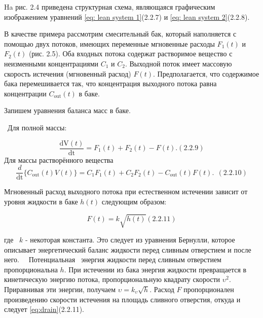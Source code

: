 		Ha рис. 2.4 приведена структурная схема, являющаяся графичес­ким изображением уравнений \eqref{eq: lean system 1}(2.2.7) и \eqref{eq: lean system 2}(2.2.8).



		В качестве примера рассмотрим смесительный бак, который напол­няется с помощью двух потоков, имеющих переменные
		мгновенные расходы  $F_1(t)$ и  $F_2(t)$ (рис. 2.5). Оба входных потока содержат раство­римое вещество с неизменными
		концентрациями  $C_1$ и  $C_2$. Выходной поток имеет массовую скорость истечения (мгновенный расход)  $F(t)$.
		Пред­полагается, что содержимое бака перемешивается так, что концентра­ция выходного потока равна концентрации 
		$C_{{\text{out}}}(t)$ в баке.



		Запишем уравнения баланса масс в баке.



		\ Для полной массы:



\begin{equation}\label{eq:full mass}
 \frac{\text{dV}(t)}{\text{dt}}=F_{1}(t)+F_{2}(t)-F(t). (2.2.9)
\end{equation}
		Для массы растворённого вещества
\begin{equation}\label{eq:solute}
		 \frac{d}{\text{dt}}\{C_{\text{out}}(t)V(t)\}=C_1F_1(t)+C_2F_2(t)-C_{\text{out}}(t)F(t).\ \ (2.2.10)
\end{equation}



\bigskip


		Мгновенный расход выходного потока при естественном истечении зависит от уровня жидкости в баке  $h(t)$ следующим
		образом:


\begin{equation}\label{eq:drain}
	F(t)=k\sqrt{h(t)}(2.2.11)
\end{equation}



		где \  $k$ - некоторая константа. Это следует из уравнения Бернулли, которое описывает энергетический баланс жидкости
		перед сливным отверстием и после него. \ \ Потенциальная \ энергия жидкости перед сливным отверстием пропорциональна 
		$h$. При истечении из бака энергия жидкости превращается в кинетическую энергию потока, пропорциональную квадрату
		скорости  $\upsilon^2$. Приравнивая эти энергии, получаем  $\upsilon=k_{\upsilon}\sqrt h$. Расход  $F$ пропорционален произведению скорости
		истечения на площадь сливного отверстия, откуда и следует \eqref{eq:drain}(2.2.11).




